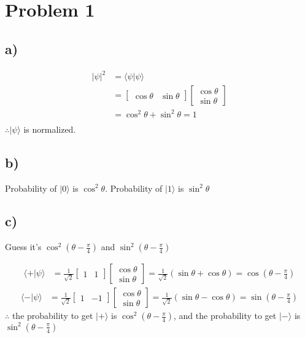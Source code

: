 \section*{Problem 1}
\subsection*{a)}
\begin{align*}
|\psi|^2 &= \langle \psi|\psi\rangle \\
&= \begin{bmatrix}
        \cos\theta & \sin\theta
    \end{bmatrix} 
    \begin{bmatrix}
        \cos\theta \\
        \sin\theta
    \end{bmatrix} \\
    &= \cos^2\theta + \sin^2\theta = 1 \\
\end{align*}
$\therefore |\psi\rangle$ is normalized.

\subsection*{b)}
Probability of $|0\rangle$ is $\cos^2\theta$. Probability of $|1\rangle$ is $\sin^2\theta$

\subsection*{c)}
Guess it's $\cos^2(\theta - \frac{\pi}{4})$ and $\sin^2(\theta - \frac{\pi}{4})$

\begin{align*}
    \langle+|\psi\rangle &= \frac{1}{\sqrt{2}}\begin{bmatrix}
        1 & 1
    \end{bmatrix}
    \begin{bmatrix}
        \cos\theta \\
        \sin\theta
    \end{bmatrix} = \frac{1}{\sqrt{2}}(\sin\theta + \cos\theta)
    = \cos(\theta - \frac{\pi}{4})
\end{align*}
\begin{align*}
    \langle-|\psi\rangle &= \frac{1}{\sqrt{2}}\begin{bmatrix}
        1 & -1
    \end{bmatrix}
    \begin{bmatrix}
        \cos\theta \\
        \sin\theta
    \end{bmatrix} = \frac{1}{\sqrt{2}}(\sin\theta - \cos\theta)
    = \sin(\theta - \frac{\pi}{4})
\end{align*}
$\therefore$ the probability to get $|+\rangle$ is $\cos^2(\theta - \frac{\pi}{4})$, and the probability to get $|-\rangle$ is $\sin^2(\theta - \frac{\pi}{4})$

